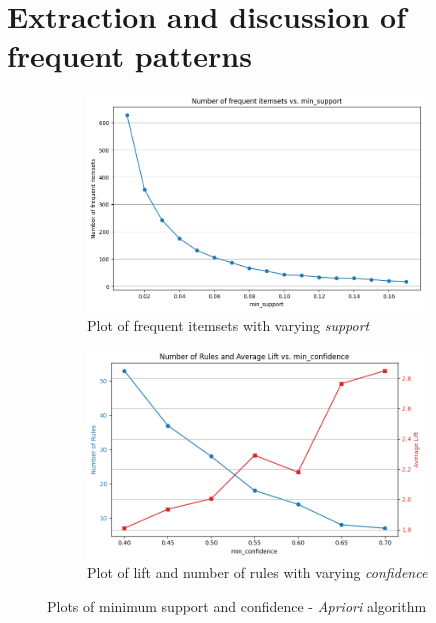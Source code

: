 \section{Extraction and discussion of frequent patterns}\label{sec:freq_patterns}
\begin{figure}[H]
    \centering
    \begin{subfigure}{0.49\textwidth}
        \centering
        \includegraphics[width=0.98\textwidth]{plots/5_min_sup.png}     %
        \caption{Plot of frequent itemsets with varying \textit{support}}
        \captionsetup{width=0.9\linewidth, justification=centering}
        \label{fig:min_sup}
    \end{subfigure}
    \begin{subfigure}{0.49\textwidth}
        \centering
        \includegraphics[width=0.98\textwidth]{plots/5_min_conf.png}     %
        \caption{Plot of lift and number of rules with varying \textit{confidence}}
        \captionsetup{width=0.9\linewidth, justification=centering}
        \label{fig:min_conf}
    \end{subfigure}
    \captionsetup{justification=centering}
    \caption{Plots of minimum support and confidence - \textit{Apriori} algorithm}
    \label{fig:distrib}
\end{figure}
